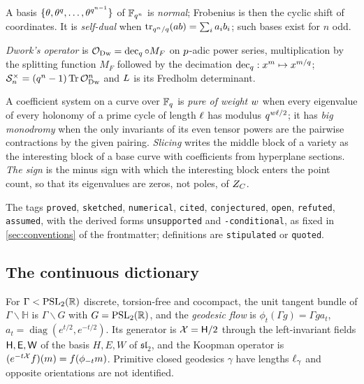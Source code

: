 \begin{definition}
\label{def:self-dual-normal-basis}
A basis $\{\theta,\theta^{q},\dots,\theta^{q^{n-1}}\}$ of $\mathbb F_{q^{n}}$ is
\emph{normal}; Frobenius is then the cyclic shift of coordinates. It is
\emph{self-dual} when $\operatorname{tr}_{q^n/q}(ab) = \sum_i a_ib_i$; such bases exist for $n$
odd.
\end{definition}

\begin{definition}
\label{def:dwork-operator}
\emph{Dwork's operator} is $\mathcal O_{\mathrm{Dw}} = \operatorname{dec}_{q}\circ M_F$ on $p$-adic power
series, multiplication by the splitting function $M_F$ followed by the decimation
$\operatorname{dec}_{q}: x^m\mapsto x^{m/q}$; $\mathcal S_{n}^{\times} = (q^n-1)\operatorname{Tr}\mathcal O_{\mathrm{Dw}}^n$ and
$L$ is its Fredholm determinant.
\end{definition}

\begin{definition}
\label{def:pure-weight}
A coefficient system on a curve over $\mathbb F_q$ is \emph{pure of weight $w$}
when every eigenvalue of every holonomy of a prime cycle of length $\ell$ has
modulus $q^{w\ell/2}$; it has \emph{big monodromy} when the only
invariants of its even tensor powers are the pairwise contractions by the
given pairing. \emph{Slicing} writes the middle block of a variety as the
interesting block of a base curve with coefficients from hyperplane
sections. \emph{The sign} is the minus sign with which the interesting block
enters the point count, so that its eigenvalues are zeros, not poles, of
$Z_C$.
\end{definition}

\begin{definition}
\label{def:status-vocabulary}
The tags \texttt{proved}, \texttt{sketched}, \texttt{numerical},
\texttt{cited}, \texttt{conjectured}, \texttt{open}, \texttt{refuted},
\texttt{assumed}, with the derived forms \texttt{unsupported} and
\texttt{-conditional}, as fixed in \cref{sec:conventions} of the frontmatter;
definitions are \texttt{stipulated} or \texttt{quoted}.
\end{definition}

\subsection{The continuous dictionary}

\begin{definition}
\label{def:geodesic-flow}
For $\Gamma<\mathrm{PSL}_2(\mathbb R)$ discrete, torsion-free and cocompact, the unit
tangent bundle of $\Gamma\backslash\mathbb H$ is $\Gamma\backslash G$ with
$G = \mathrm{PSL}_2(\mathbb R)$, and the \emph{geodesic flow} is $\phi_t(\Gamma g) =
\Gamma g a_t$, $a_t = \operatorname{diag}(e^{t/2},e^{-t/2})$. Its generator
is $\mathcal X = \mathsf H/2$ through the left-invariant fields $\mathsf H,\mathsf E,\mathsf W$ of
the basis $H,E,W$ of $\mathfrak{sl}_2$, and the Koopman operator is
$(e^{-t\mathcal X}f)(m) = f(\phi_{-t}m)$. Primitive closed geodesics $\gamma$
have lengths $\ell_\gamma$ and opposite orientations are not identified.
\end{definition}


